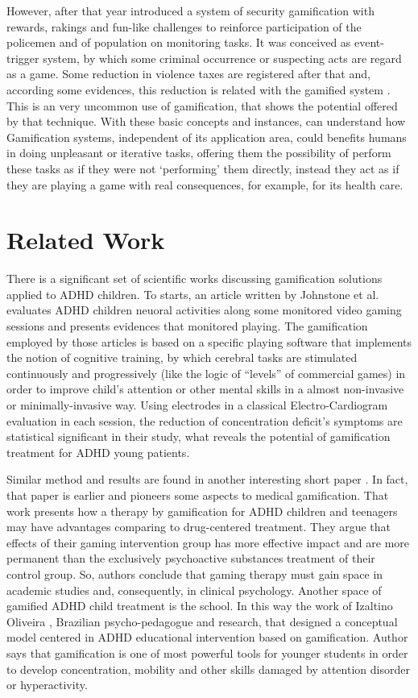 However, after that year introduced a system of security gamification with rewards, rakings and fun-like challenges to reinforce participation of the policemen and of population on monitoring tasks. It was conceived as event-trigger system, by which some criminal occurrence or suspecting acts are regard as a game. Some reduction in violence taxes are registered after that and, according some evidences, this reduction is related with the gamified system \citep{conf/cts/Aud13}. This is an very uncommon use of gamification, that shows the potential offered by that technique. With these basic concepts and instances,  can understand how Gamification systems, independent of its application area, could benefits humans in doing unpleasant or iterative tasks, offering them the possibility of perform these tasks as if they were not `performing' them directly, instead they act as if they are playing a game with real consequences, for example, for its health care.

\section{Related Work}

There is a significant set of scientific works discussing gamification solutions applied to ADHD children. To starts, an article written by Johnstone et al. \citep{Johnstone-2013} evaluates ADHD children neuoral activities along some monitored video gaming sessions and presents evidences that monitored playing. The gamification employed by those articles is based on a specific playing software  that implements the notion of cognitive training, by which cerebral tasks are stimulated continuously and progressively (like the logic of ``levels'' of commercial games) in order to improve child's attention or other mental skills in a almost non-invasive or minimally-invasive way.  Using electrodes in a classical Electro-Cardiogram evaluation in each session, the reduction of concentration deficit's symptoms are statistical significant in their study, what reveals the potential of gamification treatment for ADHD young patients.

Similar method and results are found in another interesting short paper \citep{Nemeth}. In fact, that paper is earlier and pioneers some aspects to medical gamification. That work  presents how a therapy by gamification for ADHD children and teenagers may have advantages comparing to drug-centered treatment. They argue that effects of their gaming intervention group has more effective impact and are more permanent than the exclusively psychoactive substances treatment of their control group. So, authors conclude that gaming therapy must gain space in academic studies and, consequently, in clinical psychology. Another space of gamified ADHD child treatment is the school. In this way the work of Izaltino Oliveira \citep{Oliveira}, Brazilian psycho-pedagogue and research, that designed a conceptual model centered in ADHD educational intervention based on gamification. Author says that gamification is one of most powerful tools for younger students in order to develop concentration, mobility and other skills damaged by attention disorder or hyperactivity.


